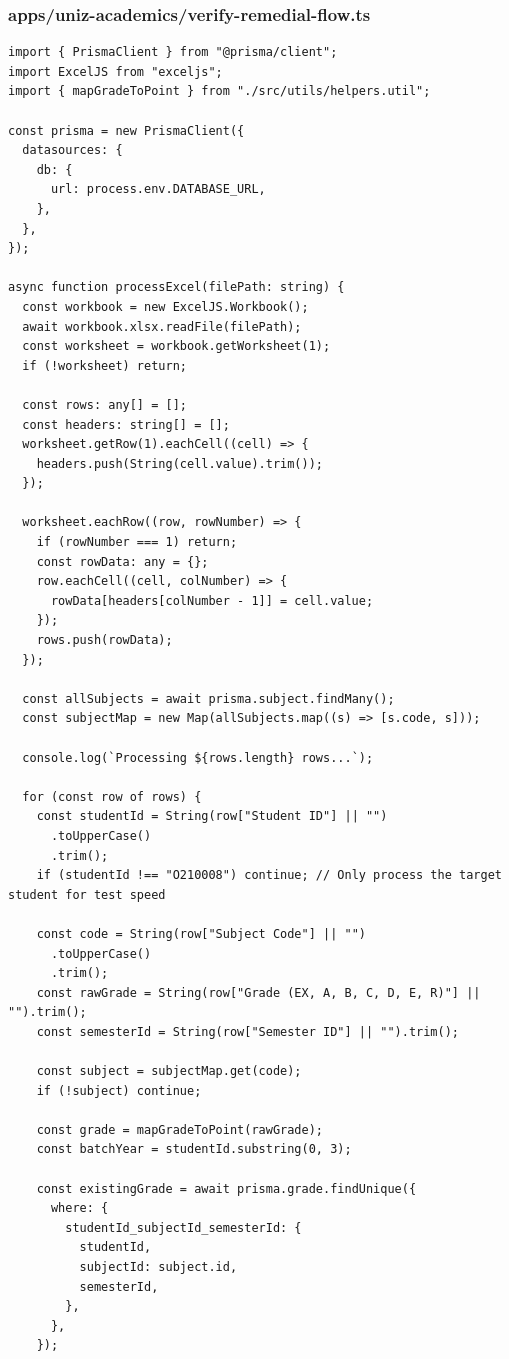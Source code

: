 \documentclass[11pt,a4paper,oneside]{article}
\begin{document}
\subsubsection*{apps/uniz-academics/verify-remedial-flow.ts}
\begin{lstlisting}
import { PrismaClient } from "@prisma/client";
import ExcelJS from "exceljs";
import { mapGradeToPoint } from "./src/utils/helpers.util";

const prisma = new PrismaClient({
  datasources: {
    db: {
      url: process.env.DATABASE_URL,
    },
  },
});

async function processExcel(filePath: string) {
  const workbook = new ExcelJS.Workbook();
  await workbook.xlsx.readFile(filePath);
  const worksheet = workbook.getWorksheet(1);
  if (!worksheet) return;

  const rows: any[] = [];
  const headers: string[] = [];
  worksheet.getRow(1).eachCell((cell) => {
    headers.push(String(cell.value).trim());
  });

  worksheet.eachRow((row, rowNumber) => {
    if (rowNumber === 1) return;
    const rowData: any = {};
    row.eachCell((cell, colNumber) => {
      rowData[headers[colNumber - 1]] = cell.value;
    });
    rows.push(rowData);
  });

  const allSubjects = await prisma.subject.findMany();
  const subjectMap = new Map(allSubjects.map((s) => [s.code, s]));

  console.log(`Processing ${rows.length} rows...`);

  for (const row of rows) {
    const studentId = String(row["Student ID"] || "")
      .toUpperCase()
      .trim();
    if (studentId !== "O210008") continue; // Only process the target student for test speed

    const code = String(row["Subject Code"] || "")
      .toUpperCase()
      .trim();
    const rawGrade = String(row["Grade (EX, A, B, C, D, E, R)"] || "").trim();
    const semesterId = String(row["Semester ID"] || "").trim();

    const subject = subjectMap.get(code);
    if (!subject) continue;

    const grade = mapGradeToPoint(rawGrade);
    const batchYear = studentId.substring(0, 3);

    const existingGrade = await prisma.grade.findUnique({
      where: {
        studentId_subjectId_semesterId: {
          studentId,
          subjectId: subject.id,
          semesterId,
        },
      },
    });


\end{lstlisting}
\end{document}
